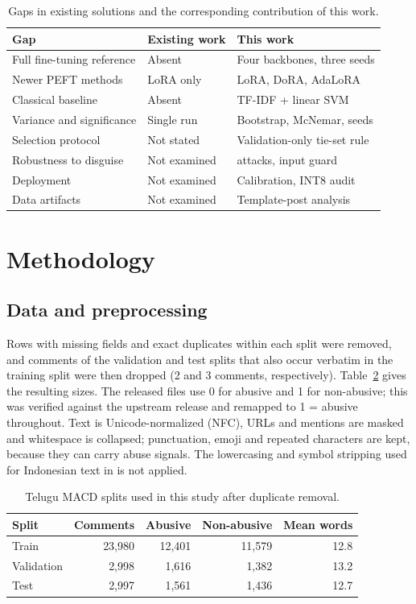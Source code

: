 \documentclass[conference]{IEEEtran}
\begin{document}
\begin{table}[t]
\caption{Gaps in existing solutions and the corresponding contribution of this work.}
\label{tab:gaps}
\centering
\footnotesize
\begin{tabular}{>{\raggedright\arraybackslash}p{2.5cm}>{\raggedright\arraybackslash}p{2.4cm}>{\raggedright\arraybackslash}p{2.7cm}}
\toprule
Gap & Existing work \cite{kaunang2026indo} & This work \\
\midrule
Full fine-tuning reference & Absent & Four backbones, three seeds \\
Newer PEFT methods & LoRA only & LoRA, DoRA, AdaLoRA \\
Classical baseline & Absent & TF-IDF + linear SVM \\
Variance and significance & Single run & Bootstrap, McNemar, seeds \\
Selection protocol & Not stated & Validation-only tie-set rule \\
Robustness to disguise & Not examined & 20 attacks, input guard \\
Deployment & Not examined & Calibration, INT8 audit \\
Data artifacts & Not examined & Template-post analysis \\
\bottomrule
\end{tabular}
\end{table}

\section{Methodology}
\label{sec:method}
\subsection{Data and preprocessing}
Rows with missing fields and exact duplicates within each split were removed, and comments of the validation and test splits that also occur verbatim in the training split were then dropped (2 and 3 comments, respectively). Table~\ref{tab:data} gives the resulting sizes. The released files use 0 for abusive and 1 for non-abusive; this was verified against the upstream release and remapped to 1 = abusive throughout. Text is Unicode-normalized (NFC), URLs and mentions are masked and whitespace is collapsed; punctuation, emoji and repeated characters are kept, because they can carry abuse signals. The lowercasing and symbol stripping used for Indonesian text in \cite{kaunang2026indo} is not applied.

\begin{table}[t]
\caption{Telugu MACD splits used in this study after duplicate removal.}
\label{tab:data}
\centering
\footnotesize
\begin{tabular}{lrrrr}
\toprule
Split & Comments & Abusive & Non-abusive & Mean words \\
\midrule
Train & 23,980 & 12,401 & 11,579 & 12.8 \\
Validation & 2,998 & 1,616 & 1,382 & 13.2 \\
Test & 2,997 & 1,561 & 1,436 & 12.7 \\
\bottomrule
\end{tabular}
\end{table}
\end{document}

